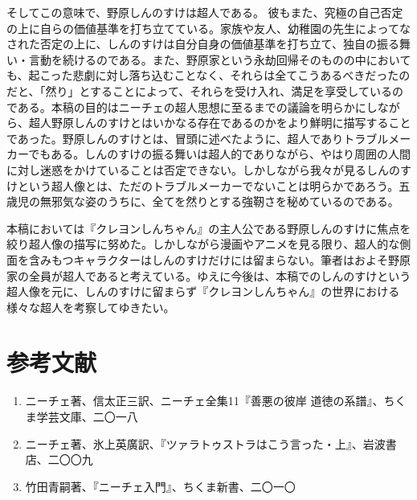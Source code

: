 \documentclass[b5j,twoside,twocolumn]{utarticle}
\begin{document}
そしてこの意味で、野原しんのすけは超人である。
彼もまた、究極の自己否定の上に自らの価値基準を打ち立てている。家族や友人、幼稚園の先生によってなされた否定の上に、しんのすけは自分自身の価値基準を打ち立て、独自の振る舞い・言動を続けるのである。また、野原家という永劫回帰そのものの中においても、起こった悲劇に対し落ち込むことなく、それらは全てこうあるべきだったのだと、「然り」とすることによって、それらを受け入れ、満足を享受しているのである。本稿の目的はニーチェの超人思想に至るまでの議論を明らかにしながら、超人野原しんのすけとはいかなる存在であるのかをより鮮明に描写することであった。野原しんのすけとは、冒頭に述べたように、超人でありトラブルメーカーでもある。しんのすけの振る舞いは超人的でありながら、やはり周囲の人間に対し迷惑をかけていることは否定できない。しかしながら我々が見るしんのすけという超人像とは、ただのトラブルメーカーでないことは明らかであろう。五歳児の無邪気な姿のうちに、全てを然りとする強靭さを秘めているのである。


本稿においては『クレヨンしんちゃん』の主人公である野原しんのすけに焦点を絞り超人像の描写に努めた。しかしながら漫画やアニメを見る限り、超人的な側面を含みもつキャラクターはしんのすけだけには留まらない。筆者はおよそ野原家の全員が超人であると考えている。ゆえに今後は、本稿でのしんのすけという超人像を元に、しんのすけに留まらず『クレヨンしんちゃん』の世界における様々な超人を考察してゆきたい。

\section*{参考文献}
{\small
\renewcommand{\labelenumi}{\pbox<y>{[\arabic{enumi}]}}
\begin{enumerate}
\item ニーチェ著、信太正三訳、ニーチェ全集11『善悪の彼岸 道徳の系譜』、ちくま学芸文庫、二〇一八
\item ニーチェ著、氷上英廣訳、『ツァラトゥストラはこう言った・上』、岩波書店、二〇〇九
\item 竹田青嗣著、『ニーチェ入門』、ちくま新書、二〇一〇
\end{enumerate}
}
\end{document}
